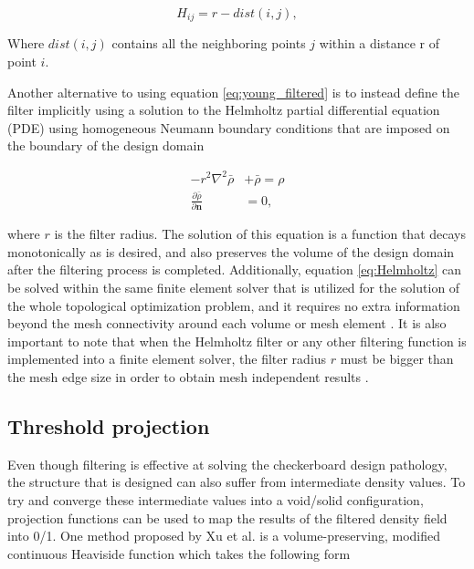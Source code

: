 \documentclass[../main.tex]{subfiles}
\begin{document}
\begin{equation}
  H_{ij} = r -  dist(i, j),
\end{equation}

Where $dist(i,j)$ contains all the neighboring points $j$ within a distance r of point $i$.

Another alternative to using equation \ref{eq:young_filtered} is to instead define the filter implicitly using a solution to the Helmholtz partial differential equation (PDE) using homogeneous Neumann boundary conditions that are imposed on the boundary of the design domain \cite{lazarovFiltersTopologyOptimization2011}

\begin{align}
  -r^2 \nabla ^2 \bar{\rho} &+ \bar{\rho} = \rho \label{eq:Helmholtz}\\ 
 \frac{\partial{\bar{\rho}}}{\partial {\bm{n}}} &= 0 \nonumber,
\end{align}

where $r$ is the filter radius. The solution of this equation is a function that decays monotonically as is desired, and also preserves the volume of the design domain after the filtering process is completed. Additionally, equation \ref{eq:Helmholtz} can be solved within the same finite element solver that is utilized for the solution of the whole topological optimization problem, and it requires no extra information beyond the mesh connectivity around each volume or mesh element \cite{lambeTopologyOptimizationUsing2018}. It is also important to note that when the Helmholtz filter or any other filtering function is implemented into a finite element solver, the filter radius $r$ must be bigger than the mesh edge size in order to obtain mesh independent results \cite{PerformingTopologyOptimization}.

\subsection{Threshold projection}

Even though filtering is effective at solving the checkerboard design pathology, the structure that is designed can also suffer from intermediate density values. To try and converge these intermediate values into a void/solid configuration, projection functions can be used to map the results of the filtered density field into 0/1. One method proposed by Xu et al. \cite{xuVolumePreservingNonlinear2010} is a volume-preserving, modified continuous Heaviside function which takes the following form
\end{document}

